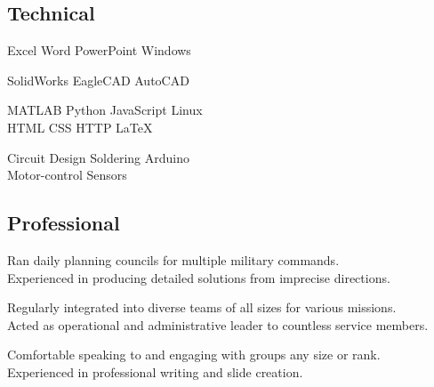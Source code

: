\subsection{Technical}

Excel \textbullet{}   Word \textbullet{} PowerPoint \textbullet{} Windows \\
\sectionsep

SolidWorks \textbullet{} EagleCAD \textbullet{} AutoCAD  \\
\sectionsep

MATLAB \textbullet{} Python \textbullet{} JavaScript \textbullet{} Linux \\
HTML \textbullet{} CSS \textbullet{} HTTP \textbullet{} \LaTeX \\
\sectionsep

Circuit Design \textbullet{} Soldering \textbullet{} Arduino \\
Motor-control \textbullet{} Sensors \\

\sectionsep

\subsection{Professional}
Ran daily planning councils for multiple military commands. \\
Experienced in producing detailed solutions from imprecise directions.\\
\sectionsep

Regularly integrated into diverse teams of all sizes for various missions. \\
Acted as operational and administrative leader to countless service members. \\
\sectionsep

Comfortable speaking to and engaging with groups any size or rank. \\
Experienced in professional writing and slide creation. \\
\sectionsep
